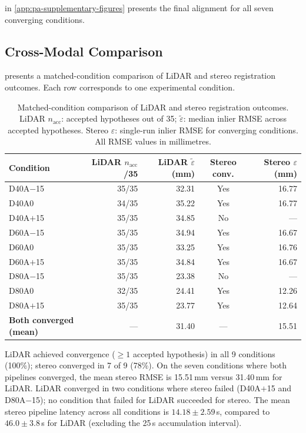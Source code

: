  in \cref{app:pa-supplementary-figures} presents the final alignment for all seven converging conditions.

\subsection{Cross-Modal Comparison}
\label{subsec:pa-results-cross-modal}

 presents a matched-condition comparison of LiDAR and stereo registration outcomes. Each row corresponds to one experimental condition.

\begin{table}[htbp]
  \centering
  \small
  \setlength{\tabcolsep}{4pt}
  \caption{Matched-condition comparison of LiDAR and stereo registration outcomes. LiDAR $n_\text{acc}$: accepted hypotheses out of 35; $\tilde{\varepsilon}$: median inlier RMSE across accepted hypotheses. Stereo $\varepsilon$: single-run inlier RMSE for converging conditions. All RMSE values in millimetres.}
  \label{tab:pa-results-cross-modal}
  \begin{tabular}{@{} l r r c r @{}}
    \toprule
    \textbf{Condition} &
    \textbf{LiDAR} \boldmath$n_\text{acc}$\textbf{/35} &
    \textbf{LiDAR} \boldmath$\tilde{\varepsilon}$ \textbf{(mm)} &
    \textbf{Stereo conv.} &
    \textbf{Stereo} \boldmath$\varepsilon$ \textbf{(mm)} \\
    \midrule
    D40A$-$15 & 35/35 & 32.31 & Yes & 16.77 \\
    D40A0     & 34/35 & 35.22 & Yes & 16.77 \\
    D40A$+$15 & 35/35 & 34.85 & No  &  ---  \\
    D60A$-$15 & 35/35 & 34.94 & Yes & 16.67 \\
    D60A0     & 35/35 & 33.25 & Yes & 16.76 \\
    D60A$+$15 & 35/35 & 34.84 & Yes & 16.67 \\
    D80A$-$15 & 35/35 & 23.38 & No  &  ---  \\
    D80A0     & 32/35 & 24.41 & Yes & 12.26 \\
    D80A$+$15 & 35/35 & 23.77 & Yes & 12.64 \\
    \midrule
    \textbf{Both converged (mean)} & --- & 31.40 & --- & 15.51 \\
    \bottomrule
  \end{tabular}
\end{table}

LiDAR achieved convergence ($\geq 1$ accepted hypothesis) in all 9 conditions (100\%); stereo converged in 7 of 9 (78\%). On the seven conditions where both pipelines converged, the mean stereo RMSE is 15.51\,mm versus 31.40\,mm for LiDAR. LiDAR converged in two conditions where stereo failed (D40A$+$15 and D80A$-$15); no condition that failed for LiDAR succeeded for stereo. The mean stereo pipeline latency across all conditions is $14.18 \pm 2.59$\,s, compared to $46.0 \pm 3.8$\,s for LiDAR (excluding the 25\,s accumulation interval).
